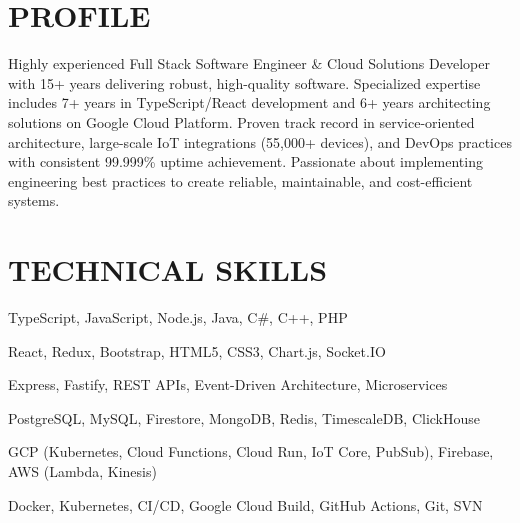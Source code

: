 \documentclass{fullstackdeveloper-ats}
\begin{document}

\vspace{0.3cm}

\section{PROFILE}
\justify
Highly experienced Full Stack Software Engineer \& Cloud Solutions Developer with 15+ years delivering robust, high-quality software. Specialized expertise includes 7+ years in TypeScript/React development and 6+ years architecting solutions on Google Cloud Platform. Proven track record in service-oriented architecture, large-scale IoT integrations (55,000+ devices), and DevOps practices with consistent 99.999\% uptime achievement. Passionate about implementing engineering best practices to create reliable, maintainable, and cost-efficient systems.

\section{TECHNICAL SKILLS}

\noindent{} TypeScript, JavaScript, Node.js, Java, C\#, C++, PHP

\vspace{0.2cm}
\noindent{} React, Redux, Bootstrap, HTML5, CSS3, Chart.js, Socket.IO

\vspace{0.2cm}
\noindent{} Express, Fastify, REST APIs, Event-Driven Architecture, Microservices

\vspace{0.2cm}
\noindent{} PostgreSQL, MySQL, Firestore, MongoDB, Redis, TimescaleDB, ClickHouse

\vspace{0.2cm}
\noindent{} GCP (Kubernetes, Cloud Functions, Cloud Run, IoT Core, PubSub), Firebase, AWS (Lambda, Kinesis)

\vspace{0.2cm}
\noindent{} Docker, Kubernetes, CI/CD, Google Cloud Build, GitHub Actions, Git, SVN
\end{document}
